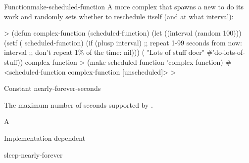\begin{functiondoc}{Function}{make-scheduled-function}{ 
     
    \returns{} }
%
%
%
A more complex  that spawns a new  to
do its work and randomly sets whether to reschedule itself (and at what
interval):
%
\W\supp
\begin{example}
  > (defun complex-function (scheduled-function)
      (let ((interval (random 100)))
        (setf ( scheduled-function)
              (if (plusp interval) 
                  ;; repeat 1-99 seconds from now:
                  interval
                  ;; don't repeat 1\% of the time:
                  nil)))
      ( "Lots of stuff doer" #'do-lots-of-stuff))
  complex-function
  > (make-scheduled-function 'complex-function)
  #<scheduled-function complex-function [unscheduled]>
  >
\end{example}

\end{functiondoc}


\begin{functiondoc}{Constant}%
  {nearly-forever-seconds}{}%

%

%

\fnsyntax

\fnpurpose The maximum number of seconds supported by .

\fnpackage {}

\fnmodule {}

\fnvaluetype A 

\fnvalue Implementation dependent

\begin{alsos}{sleep-nearly-forever}
\end{alsos}

\end{functiondoc}


